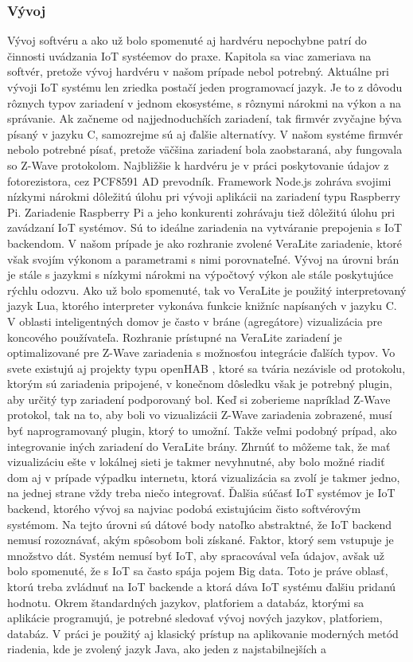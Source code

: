 \subsubsection{Vývoj}
Vývoj softvéru a ako už bolo spomenuté aj hardvéru nepochybne patrí do činnosti uvádzania IoT systéemov do praxe. Kapitola sa viac zameriava na softvér, pretože vývoj hardvéru v našom prípade nebol potrebný. Aktuálne pri vývoji IoT systému len zriedka postačí jeden programovací jazyk. Je to z dôvodu rôznych typov zariadení v jednom ekosystéme, s rôznymi nárokmi na výkon a na správanie. Ak začneme od najjednoduchších zariadení, tak firmvér zvyčajne býva písaný v jazyku C, samozrejme sú aj ďalšie alternatívy. V našom systéme firmvér nebolo potrebné písať, pretože väčšina zariadení bola zaobstaraná, aby fungovala so Z-Wave protokolom. Najbližšie k hardvéru je v práci poskytovanie údajov z fotorezistora, cez PCF8591 AD prevodník. Framework Node.js zohráva svojimi nízkymi nárokmi dôležitú úlohu pri vývoji aplikácii na zariadení typu Raspberry Pi. Zariadenie Raspberry Pi a jeho konkurenti zohrávaju tiež dôležitú úlohu pri zavádzaní IoT systémov. Sú to ideálne zariadenia na vytváranie prepojenia s IoT backendom. V našom prípade je ako rozhranie zvolené VeraLite zariadenie, ktoré však svojím výkonom a parametrami s nimi porovnateľné. Vývoj na úrovni brán je stále s jazykmi s nízkymi nárokmi na výpočtový výkon ale stále poskytujúce rýchlu odozvu. Ako už bolo spomenuté, tak vo VeraLite je použitý interpretovaný jazyk Lua, ktorého interpreter vykonáva funkcie knižníc napísaných v jazyku C. V oblasti inteligentných domov je často v bráne (agregátore) vizualizácia pre koncového používateľa. Rozhranie prístupné na VeraLite zariadení je optimalizované pre Z-Wave zariadenia s možnosťou integrácie ďalších typov. Vo svete existujú aj projekty typu openHAB \cite{IOT32}, ktoré sa tvária nezávisle od protokolu, ktorým sú zariadenia pripojené, v konečnom dôsledku však je potrebný plugin, aby určitý typ zariadení podporovaný bol. Keď si zoberieme napríklad Z-Wave protokol, tak na to, aby boli vo vizualizácii Z-Wave zariadenia zobrazené, musí byť naprogramovaný plugin, ktorý to umožní. Takže veľmi podobný prípad, ako integrovanie iných zariadení do VeraLite brány. Zhrnúť to môžeme tak, že mať vizualizáciu ešte v lokálnej sieti je takmer nevyhnutné, aby bolo možné riadiť dom aj v prípade výpadku internetu, ktorá vizualizácia sa zvolí je takmer jedno, na jednej strane vždy treba niečo integrovať. Ďalšia súčasť IoT systémov je IoT backend, ktorého vývoj sa najviac podobá existujúcim čisto softvérovým systémom. Na tejto úrovni sú dátové body natoľko abstraktné, že IoT backend nemusí rozoznávať, akým spôsobom boli získané. Faktor, ktorý sem vstupuje je množstvo dát. Systém nemusí byť IoT, aby spracovával veľa údajov, avšak už bolo spomenuté, že s IoT sa často spája pojem Big data. Toto je práve oblasť, ktorú treba zvládnuť na IoT backende a ktorá dáva IoT systému ďalšiu pridanú hodnotu. Okrem štandardných jazykov, platforiem a databáz, ktorými sa aplikácie programujú, je potrebné sledovať vývoj nových jazykov, platforiem, databáz. V práci je použitý aj klasický prístup na aplikovanie moderných metód riadenia, kde je zvolený jazyk Java, ako jeden z najstabilnejších a 